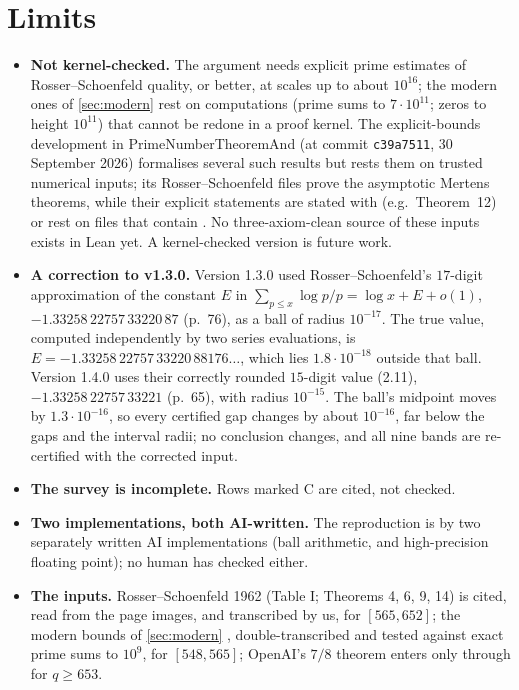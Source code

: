 \documentclass[11pt]{article}
\theoremstyle{definition}
\begin{document}
\section{Limits}\label{sec:limits}
\begin{itemize}[leftmargin=*]
\item \textbf{Not kernel-checked.} The argument needs explicit prime estimates of Rosser--Schoenfeld quality, or better, at scales up to about $10^{16}$; the modern ones of \cref{sec:modern} rest on computations (prime sums to $7\cdot10^{11}$; zeros to height $10^{11}$) that cannot be redone in a proof kernel. The explicit-bounds development in PrimeNumberTheoremAnd (at commit \texttt{c39a7511}, 30 September 2026) formalises several such results but rests them on trusted numerical inputs; its Rosser--Schoenfeld files prove the asymptotic Mertens theorems, while their explicit statements are stated with  (e.g.\ Theorem~12) or rest on files that contain . No three-axiom-clean source of these inputs exists in Lean yet. A kernel-checked version is future work.
\item \textbf{A correction to v1.3.0.} Version 1.3.0 used Rosser--Schoenfeld's $17$-digit approximation of the constant $E$ in $\sum_{p\le x}\log p/p = \log x + E + o(1)$, $-1.33258\,22757\,33220\,87$ (p.~76), as a ball of radius $10^{-17}$. The true value, computed independently by two series evaluations, is $E = -1.33258\,22757\,33220\,88176\ldots$, which lies $1.8\cdot10^{-18}$ outside that ball. Version 1.4.0 uses their correctly rounded $15$-digit value (2.11), $-1.33258\,22757\,33221$ (p.~65), with radius $10^{-15}$. The ball's midpoint moves by $1.3\cdot10^{-16}$, so every certified gap changes by about $10^{-16}$, far below the gaps and the interval radii; no conclusion changes, and all nine bands are re-certified with the corrected input.
\item \textbf{The survey is incomplete.} Rows marked C are cited, not checked.
\item \textbf{Two implementations, both AI-written.} The reproduction is by two separately written AI implementations (ball arithmetic, and high-precision floating point); no human has checked either.
\item \textbf{The inputs.} Rosser--Schoenfeld 1962 (Table I; Theorems 4, 6, 9, 14) is cited, read from the page images, and transcribed by us, for $[565, 652]$; the modern bounds of \cref{sec:modern} \cite{BKLNW,Buthe2018}, double-transcribed and tested against exact prime sums to $10^9$, for $[548, 565]$; OpenAI's $7/8$ theorem enters only through \cite{CN1paper} for $q \ge 653$.
\end{itemize}
\end{document}
